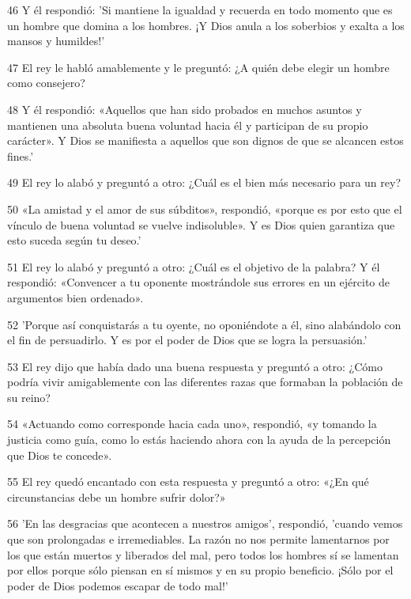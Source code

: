 \par 46 Y él respondió: 'Si mantiene la igualdad y recuerda en todo momento que es un hombre que domina a los hombres. ¡Y Dios anula a los soberbios y exalta a los mansos y humildes!'

\par 47 El rey le habló amablemente y le preguntó: ¿A quién debe elegir un hombre como consejero?

\par 48 Y él respondió: «Aquellos que han sido probados en muchos asuntos y mantienen una absoluta buena voluntad hacia él y participan de su propio carácter». Y Dios se manifiesta a aquellos que son dignos de que se alcancen estos fines.'

\par 49 El rey lo alabó y preguntó a otro: ¿Cuál es el bien más necesario para un rey?

\par 50 «La amistad y el amor de sus súbditos», respondió, «porque es por esto que el vínculo de buena voluntad se vuelve indisoluble». Y es Dios quien garantiza que esto suceda según tu deseo.'

\par 51 El rey lo alabó y preguntó a otro: ¿Cuál es el objetivo de la palabra? Y él respondió: «Convencer a tu oponente mostrándole sus errores en un ejército de argumentos bien ordenado».

\par 52 'Porque así conquistarás a tu oyente, no oponiéndote a él, sino alabándolo con el fin de persuadirlo. Y es por el poder de Dios que se logra la persuasión.'

\par 53 El rey dijo que había dado una buena respuesta y preguntó a otro: ¿Cómo podría vivir amigablemente con las diferentes razas que formaban la población de su reino?

\par 54 «Actuando como corresponde hacia cada uno», respondió, «y tomando la justicia como guía, como lo estás haciendo ahora con la ayuda de la percepción que Dios te concede».

\par 55 El rey quedó encantado con esta respuesta y preguntó a otro: «¿En qué circunstancias debe un hombre sufrir dolor?»

\par 56 'En las desgracias que acontecen a nuestros amigos', respondió, 'cuando vemos que son prolongadas e irremediables. La razón no nos permite lamentarnos por los que están muertos y liberados del mal, pero todos los hombres sí se lamentan por ellos porque sólo piensan en sí mismos y en su propio beneficio. ¡Sólo por el poder de Dios podemos escapar de todo mal!'

